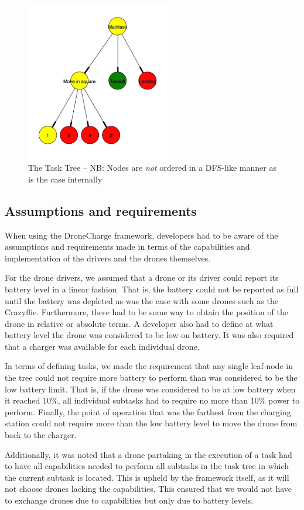 \begin{figure}[h]
\begin{center}
\includegraphics[height=7cm]{images/task-graph.png}
\caption{The Task Tree -- NB: Nodes are \textit{not} ordered in a DFS-like manner as is the case internally}
\label{fig:tasktree}
\end{center}
\end{figure}

\subsection{Assumptions and requirements}
When using the DroneCharge framework, developers had to be aware of the assumptions and requirements made in terms of the capabilities and implementation of the drivers and the drones themselves.

For the drone drivers, we assumed that a drone or its driver could report its battery level in a linear fashion. That is, the battery could not be reported as full until the battery was depleted as was the case with some drones such as the Crazyflie. Furthermore, there had to be some way to obtain the position of the drone in relative or absolute terms. A developer also had to define at what battery level the drone was considered to be low on battery. It was also required that a charger was available for each individual drone.

In terms of defining tasks, we made the requirement that any single leaf-node in the tree could not require more battery to perform than was considered to be the low battery limit. That is, if the drone was considered to be at low battery when it reached 10\%, all individual subtasks had to require no more than 10\% power to perform. Finally, the point of operation that was the farthest from the charging station could not require more than the low battery level to move the drone from back to the charger.

Additionally, it was noted that a drone partaking in the execution of a task had to have all capabilities  needed to perform all subtasks in the task tree in which the current subtask is located. This is upheld by the framework itself, as it will not choose drones lacking the capabilities. This ensured that we would not have to exchange drones due to capabilities but only due to battery levels.